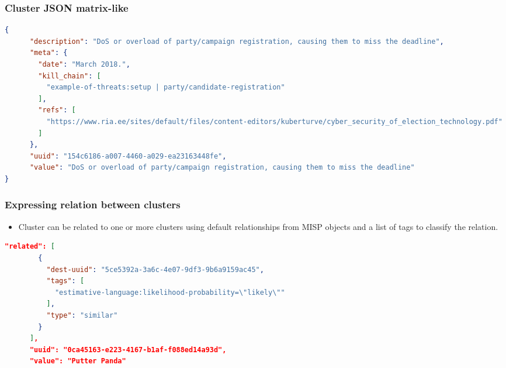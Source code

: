 \begin{frame}[fragile]
        \frametitle{Cluster JSON matrix-like}
        \begin{adjustbox}{keepaspectratio}
            \begin{lstlisting}[language=json,firstnumber=1]
{
      "description": "DoS or overload of party/campaign registration, causing them to miss the deadline",
      "meta": {
        "date": "March 2018.",
        "kill_chain": [
          "example-of-threats:setup | party/candidate-registration"
        ],
        "refs": [
          "https://www.ria.ee/sites/default/files/content-editors/kuberturve/cyber_security_of_election_technology.pdf"
        ]
      },
      "uuid": "154c6186-a007-4460-a029-ea23163448fe",
      "value": "DoS or overload of party/campaign registration, causing them to miss the deadline"
}
        \end{lstlisting}
        \end{adjustbox}
\end{frame}


\begin{frame}[fragile]
        \frametitle{Expressing relation between clusters}
        \begin{itemize}
                \item Cluster can be related to one or more clusters using default relationships from MISP objects and a list of tags to classify the relation.
        \end{itemize}

        \begin{lstlisting}[language=json,firstnumber=1]
        "related": [
        {
          "dest-uuid": "5ce5392a-3a6c-4e07-9df3-9b6a9159ac45",
          "tags": [
            "estimative-language:likelihood-probability=\"likely\""
          ],
          "type": "similar"
        }
      ],
      "uuid": "0ca45163-e223-4167-b1af-f088ed14a93d",
      "value": "Putter Panda"
        \end{lstlisting}
\end{frame}




